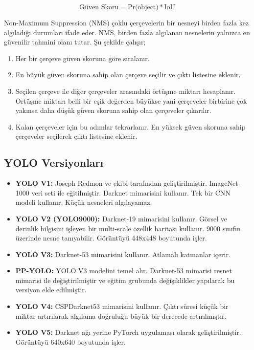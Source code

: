 \[\text{Güven Skoru} = \text{Pr(object)} * \text{IoU}\]

Non-Maximum Suppression (NMS) çoklu çerçevelerin bir nesneyi birden fazla kez algıladığı durumları ifade eder. NMS, birden fazla algılanan nesnelerin yalnızca en güvenilir tahmini olanı tutar. Şu şekilde çalışır;
\begin{enumerate}
	\item Her bir çerçeve güven skoruna göre sıralanır.
	\item En büyük güven skoruna sahip olan çerçeve seçilir ve çıktı listesine eklenir.
	\item Seçilen çerçeve ile diğer çerçeveler arasındaki örtüşme miktarı hesaplanır. Örtüşme miktarı belli bir eşik değerden büyükse yani çerçeveler birbirine çok yakınsa daha düşük güven skoruna sahip olan çerçeveler çıkarılır.
	\item Kalan çerçeveler için bu adımlar tekrarlanır. En yüksek güven skoruna sahip çerçeveler seçilerek çıktı listesine eklenir.
\end{enumerate}

\subsection{YOLO Versiyonları}
\begin{itemize}
	\item \textbf{YOLO V1:} Joseph Redmon ve ekibi tarafından geliştirilmiştir. ImageNet-1000 veri seti ile eğitilmiştir. Darknet mimarisini kullanır. Tek bir CNN modeli kullanır. Küçük nesneleri algılayamaz.
	\item \textbf{YOLO V2 (YOLO9000):} Darknet-19 mimarisini kullanır. Görsel ve derinlik bilgisini işleyen bir multi-scale özellik haritası kullanır. 9000 sınıfın üzerinde nesne tanıyabilir. Görüntüyü 448x448 boyutunda işler.
	\item \textbf{YOLO V3:} Darknet-53 mimarisini kullanır. Atlamalı katmanlar içerir.
	\item \textbf{PP-YOLO:} YOLO V3 modelini temel alır. Darknet-53 mimarisi resnet mimarisi ile değiştirilmiştir ve eğitim grubunda değişiklikler yapılarak bu versiyon elde edilmiştir.
	\item \textbf{YOLO V4:} CSPDarknet53 mimarisini kullanır.  Çıktı süresi küçük bir miktar artırılarak algılama doğruluğu büyük bir derecede artırılmıştır.
	\item \textbf{YOLO V5:} Darknet ağı yerine PyTorch uygulaması olarak geliştirilmiştir. Görüntüyü 640x640 boyutunda işler. 
\end{itemize}

\newpage